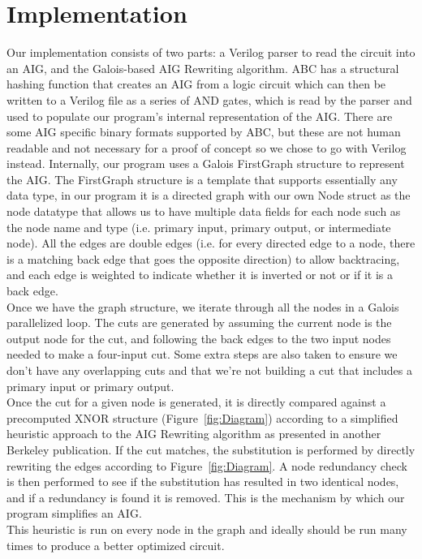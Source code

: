 \documentclass[twocolumn]{article}
\begin{document}
\section{Implementation}
Our implementation consists of two parts: a Verilog parser to read the circuit into an AIG, and the Galois-based AIG Rewriting algorithm. ABC has a structural hashing function that creates an AIG from a logic circuit which can then be written to a Verilog file as a series of AND gates, which is read by the parser and used to populate our program's internal representation of the AIG.  There are some AIG specific binary formats supported by ABC, but these are not human readable and not necessary for a proof of concept so we chose to go with Verilog instead.\newline\indent
Internally, our program uses a Galois FirstGraph structure to represent the AIG. The FirstGraph structure is a template that supports essentially any data type, in our program it is a directed graph with our own Node struct as the node datatype that allows us to have multiple data fields for each node such as the node name and type (i.e. primary input, primary output, or intermediate node).  All the edges are double edges (i.e. for every directed edge to a node, there is a matching back edge that goes the opposite direction) to allow backtracing, and each edge is weighted to indicate whether it is inverted or not or if it is a back edge.\\\indent
Once we have the graph structure, we iterate through all the nodes in a Galois parallelized loop. The cuts are generated by assuming the current node is the output node for the cut, and following the back edges to the two input nodes needed to make a four-input cut.  Some extra steps are also taken to ensure we don't have any overlapping cuts and that we're not building a cut that includes a primary input or primary output.\\\indent
Once the cut for a given node is generated, it is directly compared against a precomputed XNOR structure (Figure~\ref{fig:Diagram}) according to a simplified heuristic approach to the AIG Rewriting algorithm as presented in another Berkeley publication\cite{HEURISTIC}. If the cut matches, the substitution is performed by directly rewriting the edges according to Figure~\ref{fig:Diagram}. A node redundancy check is then performed to see if the substitution has resulted in two identical nodes, and if a redundancy is found it is removed. This is the mechanism by which our program simplifies an AIG.\\\indent
This heuristic is run on every node in the graph and ideally should be run many times to produce a better optimized circuit.
\end{document}
